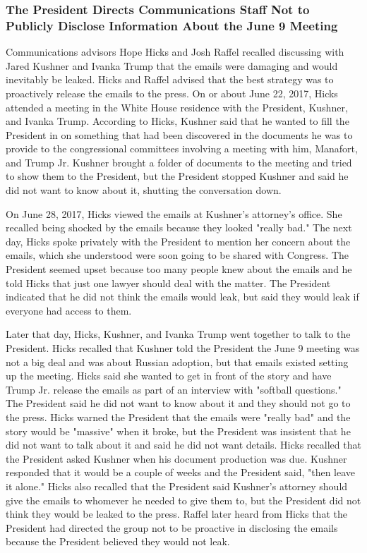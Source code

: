 \subsubsection{The President Directs Communications Staff Not to Publicly Disclose Information About the June 9 Meeting}

Communications advisors Hope Hicks and Josh Raffel recalled discussing with Jared Kushner and Ivanka Trump that the emails were damaging and would inevitably be leaked.%
Hicks and Raffel advised that the best strategy was to proactively release the emails to the press.%
On or about June 22, 2017, Hicks attended a meeting in the White House residence with the President, Kushner, and Ivanka Trump.%
According to Hicks, Kushner said that he wanted to fill the President in on something that had been discovered in the documents he was to provide to the congressional committees involving a meeting with him, Manafort, and Trump Jr.%
Kushner brought a folder of documents to the meeting and tried to show them to the President, but the President stopped Kushner and said he did not want to know about it, shutting the conversation down.%

On June 28, 2017, Hicks viewed the emails at Kushner's attorney's office.%
She recalled being shocked by the emails because they looked "really bad."%
The next day, Hicks spoke privately with the President to mention her concern about the emails, which she understood were soon going to be shared with Congress.%
The President seemed upset because too many people knew about the emails and he told Hicks that just one lawyer should deal with the matter.%
The President indicated that he did not think the emails would leak, but said they would leak if everyone had access to them.%

Later that day, Hicks, Kushner, and Ivanka Trump went together to talk to the President.%
Hicks recalled that Kushner told the President the June 9 meeting was not a big deal and was about Russian adoption, but that emails existed setting up the meeting.%
Hicks said she wanted to get in front of the story and have Trump Jr. release the emails as part of an interview with "softball questions."%
The President said he did not want to know about it and they should not go to the press.%
Hicks warned the President that the emails were "really bad" and the story would be "massive" when it broke, but the President was insistent that he did not want to talk about it and said he did not want details.%
Hicks recalled that the President asked Kushner when his document production was due.%
Kushner responded that it would be a couple of weeks and the President said, "then leave it alone."%
Hicks also recalled that the President said Kushner's attorney should give the emails to whomever he needed to give them to, but the President did not think they would be leaked to the press.%
Raffel later heard from Hicks that the President had directed the group not to be proactive in disclosing the emails because the President believed they would not leak.%

